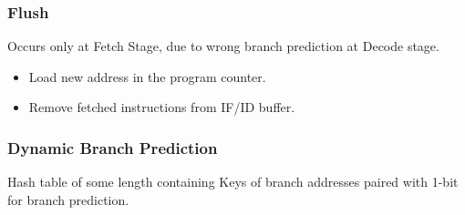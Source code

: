 \documentclass[12pt]{report}
\begin{document}
\subsubsection{Flush}
Occurs only at Fetch Stage, due to wrong branch prediction at Decode stage.
\begin{itemize}
    \item Load new address in the program counter.
    \item Remove fetched instructions from IF/ID buffer.
\end{itemize}

\subsubsection{Dynamic Branch Prediction}
Hash table of some length containing Keys of branch addresses paired with 1-bit for branch prediction.
\end{document}
